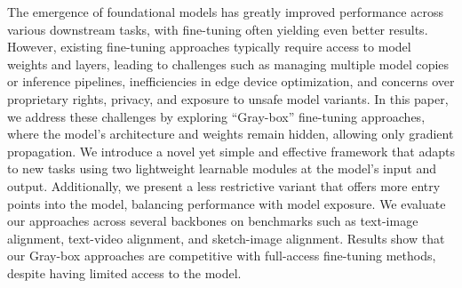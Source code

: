 The emergence of foundational models has greatly improved performance across various downstream tasks, with fine-tuning often yielding even better results. However, existing fine-tuning approaches typically require access to model weights and layers, leading to challenges such as managing multiple model copies or inference pipelines, inefficiencies in edge device optimization, and concerns over proprietary rights, privacy, and exposure to unsafe model variants. In this paper, we address these challenges by exploring ``Gray-box'' fine-tuning approaches, where the model's architecture and weights remain hidden, allowing only gradient propagation. We introduce a novel yet simple and effective framework that adapts to new tasks using two lightweight learnable modules at the model's input and output. Additionally, we present a less restrictive variant that offers more entry points into the model, balancing performance with model exposure. We evaluate our approaches across several backbones on benchmarks such as text-image alignment, text-video alignment, and sketch-image alignment. Results show that our Gray-box approaches are competitive with full-access fine-tuning methods, despite having limited access to the model.